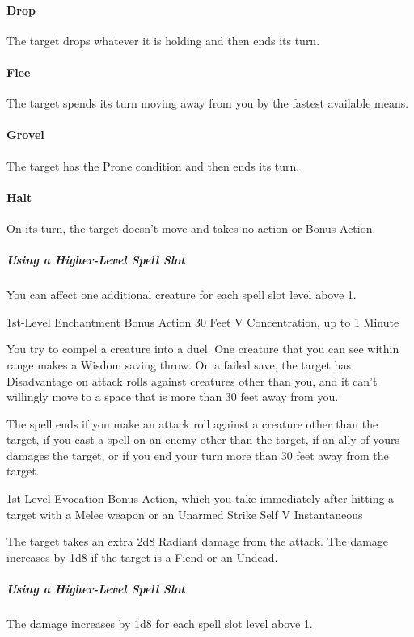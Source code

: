 \documentclass[letterpaper,openany,oneside,twocolumn]{book}
\begin{document}
\paragraph*{Drop} The target drops whatever it is holding and then ends its turn.

\paragraph*{Flee} The target spends its turn moving away from you by the fastest available means.

\paragraph*{Grovel} The target has the Prone condition and then ends its turn.

\paragraph*{Halt} On its turn, the target doesn't move and takes no action or Bonus Action.

\subparagraph*{Using a Higher-Level Spell Slot} You can affect one additional creature for each spell slot level above 1.

	{1st-Level Enchantment}
	{Bonus Action}
	{30 Feet}
	{V}
	{Concentration, up to 1 Minute}

You try to compel a creature into a duel. One creature that you can see within range makes a Wisdom saving throw. On a failed save, the target has Disadvantage on attack rolls against creatures other than you, and it can't willingly move to a space that is more than 30 feet away from you.

The spell ends if you make an attack roll against a creature other than the target, if you cast a spell on an enemy other than the target, if an ally of yours damages the target, or if you end your turn more than 30 feet away from the target.

	{1st-Level Evocation}
	{Bonus Action, which you take immediately after hitting a target with a Melee weapon or an Unarmed Strike}
	{Self}
	{V}
	{Instantaneous}

The target takes an extra 2d8 Radiant damage from the attack. The damage increases by 1d8 if the target is a Fiend or an Undead.

\subparagraph*{Using a Higher-Level Spell Slot} The damage increases by 1d8 for each spell slot level above 1.
\end{document}
